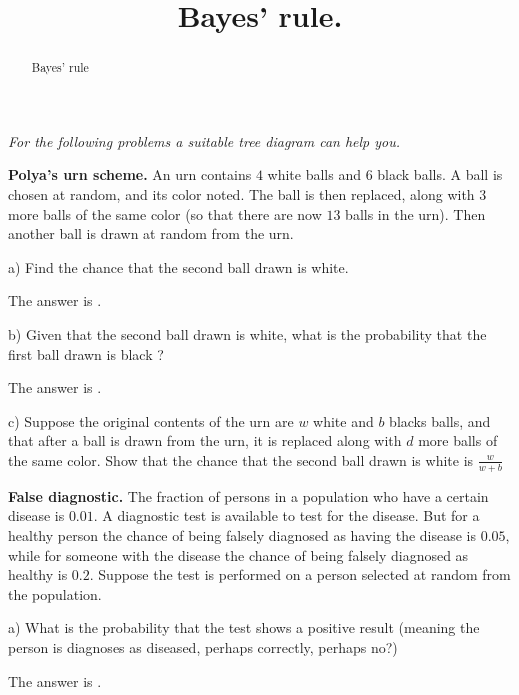 \documentclass{ximera}
\title{Bayes' rule.}
\begin{document}
\begin{abstract}
Bayes' rule
\end{abstract}
\maketitle

{\it For the following problems a suitable tree diagram can help you.}\vspace{.25cm}

{\bf Polya's urn scheme.} An urn contains $4$ white balls and $6$ black balls. A ball is chosen at random, and its color noted. The ball is then replaced, along with $3$ more balls of the same color (so that there are now $13$ balls in the urn). Then another ball is drawn at random from the urn.

\begin{question}
a) Find the chance that the second ball drawn is white.
     \begin{solution}
          The answer is .
      \end{solution}
\end{question}

\begin{question}
b) Given that the second ball drawn is white, what is the probability that the first ball drawn is black ?
     \begin{solution}
          The answer is .
      \end{solution}
\end{question}
      
\begin{question}
c) Suppose the original contents of the urn are $w$ white and $b$ blacks balls, and that after a ball is drawn from the urn, it is replaced along with $d$ more balls of the same color. Show that the chance that the second ball drawn is white is $\frac{w}{w+b}$  
\end{question}

{\bf False diagnostic.} The fraction of persons in a population who have a certain disease is $0.01$. A diagnostic test is available to test for the disease. But for a healthy person the chance of being falsely diagnosed as having the disease is $0.05$, while for someone with the disease the chance of being falsely diagnosed as healthy is $0.2$. Suppose the test is performed on a person selected at random from the population.

\begin{question}
a) What is the probability that the test shows a positive result (meaning the person is diagnoses as diseased, perhaps correctly, perhaps no?)
     \begin{solution}
          The answer is  .
      \end{solution}
\end{question}
\end{document}
